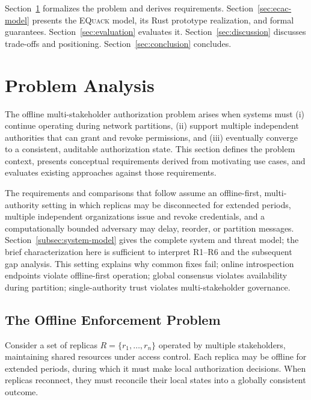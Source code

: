 \documentclass[10pt,journal,compsoc]{IEEEtran}
\newcommand{\equack}{\textsc{EQuack}}
\begin{document}
  Section~\ref{sec:problem-analysis} formalizes the problem and derives requirements.
  Section~\ref{sec:ecac-model} presents the \equack{} model, its Rust prototype
  realization, and formal guarantees.
  Section~\ref{sec:evaluation} evaluates it.
  Section~\ref{sec:discussion} discusses trade-offs and positioning.
  Section~\ref{sec:conclusion} concludes.

\section{Problem Analysis}\label{sec:problem-analysis}

The offline multi-stakeholder authorization problem arises when systems must (i) continue operating during network partitions, (ii) support multiple independent authorities that can grant and revoke permissions, and (iii) eventually converge to a consistent, auditable authorization state. This section defines the problem context, presents conceptual requirements derived from motivating use cases, and evaluates existing approaches against those requirements.

The requirements and comparisons that follow assume an offline-first, multi-authority setting in which replicas may be disconnected for extended periods, multiple independent organizations issue and revoke credentials, and a computationally bounded adversary may delay, reorder, or partition messages. Section~\ref{subsec:system-model} gives the complete system and threat model; the brief characterization here is sufficient to interpret R1--R6 and the subsequent gap analysis. This setting explains why common fixes fail; online introspection endpoints violate offline-first operation; global consensus violates availability during partition; single-authority trust violates multi-stakeholder governance.



\subsection{The Offline Enforcement Problem}

Consider a set of replicas $R = \{r_1, \ldots, r_n\}$ operated by multiple stakeholders, maintaining shared resources under access control. Each replica may be offline for extended periods, during which it must make local authorization decisions. When replicas reconnect, they must reconcile their local states into a globally consistent outcome.
\end{document}
